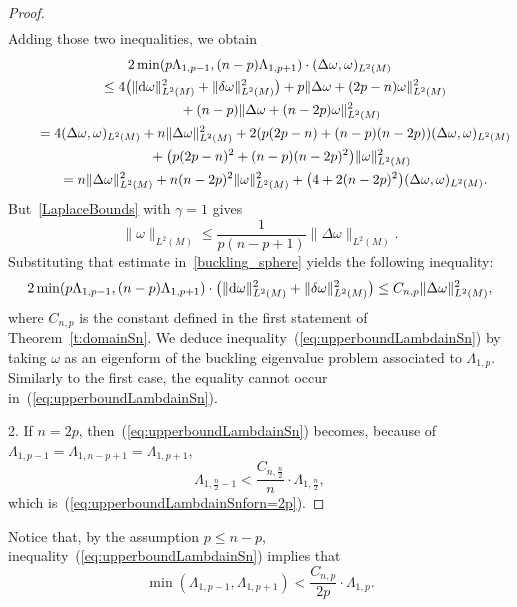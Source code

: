 \documentclass[10pt,a4paper]{amsart}
\numberwithin{equation}{section}
\theoremstyle{definition}
\begin{document}
\begin{proof}
\begin{gather*}
\end{gather*}
Adding those two inequalities, we obtain
\begin{gather}
\nonumber 2\min(p\Lambda_{1,p-1}, (n-p)\Lambda_{1,p+1})\cdot (\Delta\omega,\omega)_{L^2(M)}
\\
\nonumber\qquad{}\le{}4\bigl(\|{\rm d}\omega\|^2_{L^2(M)}+\|\delta\omega\|^2_{L^2(M)}\bigr)+p\|\Delta\omega+(2p-n)\omega\|^2_{L^2(M)}\\
\nonumber\qquad\quad{}+(n-p)\|\Delta\omega+(n-2p)\omega\|^2_{L^2(M)}
\\
\nonumber\qquad{}=4 (\Delta\omega,\omega )_{L^2(M)}+n\|\Delta\omega\|_{L^2(M)}^2 +2 (p(2p-n)+(n-p)(n-2p) ) (\Delta\omega,\omega )_{L^2(M)}\\
\nonumber\qquad\quad{}+\bigl(p(2p-n)^2+(n-p)(n-2p)^2\bigr)\|\omega\|_{L^2(M)}^2\\
\qquad{}=n\|\Delta\omega\|^2_{L^2(M)}+n(n-2p)^2\|\omega\|^2_{L^2(M)}+\bigl(4+2(n-2p)^2\bigr)(\Delta\omega,\omega)_{L^2(M)}.\label{buckling_sphere}
\end{gather}
But~\eqref{LaplaceBounds} with $\gamma=1$ gives
\[\|\omega\|_{L^2(M)} \le \frac{1}{p(n-p+1)} \|\Delta \omega\|_{L^2(M)}.\]
Substituting that estimate in~\eqref{buckling_sphere} yields the following inequality:
\[2 \min(p\Lambda_{1,p-1}, (n-p)\Lambda_{1,p+1})\cdot\bigl(\|{\rm d}\omega\|_{L^2(M)}^2+\|\delta\omega\|_{L^2(M)}^2\bigr) \le C_{n,p} \|\Delta \omega\|^2_{L^2(M)},\]
where $C_{n,p}$ is the constant defined in the first statement of Theorem~\ref{t:domainSn}.
We deduce inequality~(\ref{eq:upperboundLambdainSn}) by taking $\omega$ as an eigenform of the buckling eigenvalue problem associated to $\Lambda_{1,p}$. Similarly to the first case, the equality cannot occur in~(\ref{eq:upperboundLambdainSn}).

2. If $n=2p$, then~(\ref{eq:upperboundLambdainSn}) becomes, because of $\Lambda_{1,p-1}=\Lambda_{1,n-p+1}=\Lambda_{1,p+1}$,
\[\Lambda_{1,\frac{n}{2}-1}<\frac{C_{n,\frac{n}{2}}}{n}\cdot\Lambda_{1,\frac{n}{2}},\]
which is~(\ref{eq:upperboundLambdainSnforn=2p}).
\end{proof}


Notice that, by the assumption $p\leq n-p$, inequality~(\ref{eq:upperboundLambdainSn}) implies that
\[\min(\Lambda_{1,p-1},\Lambda_{1,p+1})< \frac{C_{n,p}}{2p}\cdot\Lambda_{1,p}.\]
\end{document}
